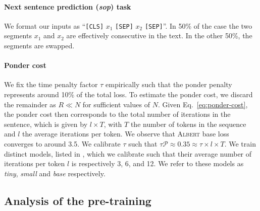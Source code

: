 \paragraph{Next sentence prediction (\textit{sop}) task} We format our inputs as ``\texttt{[CLS]} $x_1$ \texttt{[SEP]} $x_2$ \texttt{[SEP]}''. In 50\% of the case the two segments $x_1$ and $x_2$ are effectively consecutive in the text. In the other 50\%, the segments are swapped. 

\paragraph{Ponder cost} We fix the time penalty factor $\tau$ empirically such that the ponder penalty represents around 10\% of the total loss. To estimate the ponder cost, we discard the remainder as $R \ll N$ for sufficient values of $N$. Given Eq.~\ref{eq:ponder-cost}, the ponder cost then corresponds to the total number of iterations in the sentence, which is given by $l \times T$, with $T$ the number of tokens in the sequence and $l$ the average iterations per token. We observe that \textsc{Albert} base loss converges to around 3.5. We calibrate $\tau$ such that  $\tau\mathcal{P} \approx 0.35 \approx \tau \times l \times T$. We train distinct models, listed in , which we calibrate such that their average number of iterations per token $l$ is respectively 3, 6, and 12. We refer to these models as \textit{tiny}, \textit{small} and \textit{base} respectively. 

\subsection{Analysis of the pre-training}

